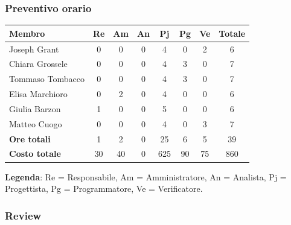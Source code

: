 \documentclass[11pt,a4paper]{article}
\begin{document}
\subsubsection{Preventivo orario}
\begin{center}
    \begin{tabular}{|l|c|c|c|c|c|c|c|}
        \hline
        \textbf{Membro} & \textbf{Re} & \textbf{Am} & \textbf{An} & \textbf{Pj} & \textbf{Pg} & \textbf{Ve} & \textbf{Totale} \\
        \hline
        Joseph Grant & 0 & 0 & 0 & 4 & 0 & 2 & 6 \\
        \hline
        Chiara Grossele & 0 & 0 & 0 & 4 & 3 & 0 & 7 \\
        \hline
        Tommaso Tombacco & 0 & 0 & 0 & 4 & 3 & 0 & 7 \\
        \hline
        Elisa Marchioro & 0 & 2 & 0 & 4 & 0 & 0 & 6 \\
        \hline
        Giulia Barzon & 1 & 0 & 0 & 5 & 0 & 0 & 6 \\
        \hline
        Matteo Cuogo & 0 & 0 & 0 & 4 & 0 & 3 & 7 \\
        \hline
        \textbf{Ore totali} & 1 & 2 & 0 & 25 & 6 & 5 & 39 \\
        \hline
        \textbf{Costo totale} & 30 & 40 & 0 & 625 & 90 & 75 & 860 \\
        \hline
    \end{tabular}
\end{center}

\noindent \textbf{Legenda}: Re = Responsabile, Am = Amministratore, An = Analista, Pj = Progettista, Pg = Programmatore, Ve = Verificatore.

\subsubsection{Review}
\end{document}

